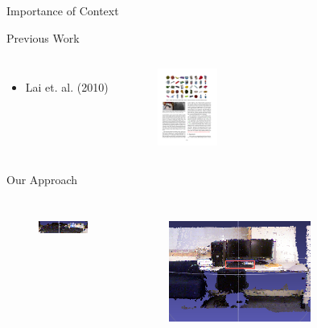 \documentclass{beamer}
\begin{document}
\begin{frame}{Importance of Context}
\begin{block}{Previous Work}
\begin{columns}[t!]
\vskip -0.2in
\begin{itemize}
\item Lai et. al. (2010)
\end{itemize}
\begin{figure}
\vskip -0.2in
\includegraphics[width=.9\linewidth,height=1in]{lai_objects.pdf}
\end{figure}
\end{columns}
\end{block}
\begin{block}{Our Approach}
\begin{columns}

\vskip -0.2in
  \begin{figure}
  \includegraphics[width=.7\linewidth]{keyboard.png}\\
  \end{figure}
 
\pause
\vskip -0.2in
  \begin{figure}
  \includegraphics[width=.9\linewidth,height=1.3in]{keyboard_scene.png}\\
  \end{figure}
\end{columns}
\end{block}
\end{frame}
\end{document}

